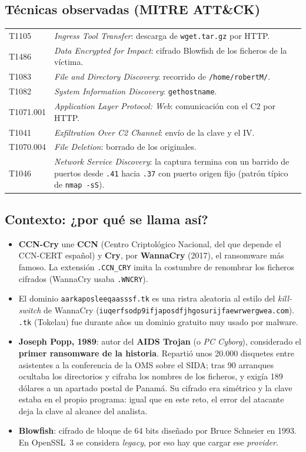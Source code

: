 \documentclass[11pt,a4paper]{article}
\begin{document}
\subsection{Técnicas observadas (MITRE ATT\&CK)}
\begin{tabularx}{\linewidth}{@{}lX@{}}
\toprule
T1105 & \emph{Ingress Tool Transfer}: descarga de \texttt{wget.tar.gz} por HTTP. \\
T1486 & \emph{Data Encrypted for Impact}: cifrado Blowfish de los ficheros de la víctima. \\
T1083 & \emph{File and Directory Discovery}: recorrido de \texttt{/home/robertM/}. \\
T1082 & \emph{System Information Discovery}: \texttt{gethostname}. \\
T1071.001 & \emph{Application Layer Protocol: Web}: comunicación con el C2 por HTTP. \\
T1041 & \emph{Exfiltration Over C2 Channel}: envío de la clave y el IV. \\
T1070.004 & \emph{File Deletion}: borrado de los originales. \\
T1046 & \emph{Network Service Discovery}: la captura termina con un barrido de puertos desde \texttt{.41} hacia
        \texttt{.37} con puerto origen fijo (patrón típico de \texttt{nmap -sS}). \\
\bottomrule
\end{tabularx}

\subsection{Contexto: ¿por qué se llama así?}
\begin{itemize}
  \item \textbf{CCN-Cry} une \textbf{CCN} (Centro Criptológico Nacional, del que depende el CCN-CERT español) y
        \textbf{Cry}, por \textbf{WannaCry} (2017), el ransomware más famoso. La extensión \texttt{.CCN\_CRY} imita
        la costumbre de renombrar los ficheros cifrados (WannaCry usaba \texttt{.WNCRY}).
  \item El dominio \texttt{aarkaposleeqaasssf.tk} es una ristra aleatoria al estilo del \emph{kill-switch} de WannaCry
        (\texttt{iuqerfsodp9ifjaposdfjhgosurijfaewrwergwea.com}). \texttt{.tk} (Tokelau) fue durante años un dominio
        gratuito muy usado por malware.
  \item \textbf{Joseph Popp, 1989}: autor del \textbf{AIDS Trojan} (o \emph{PC Cyborg}), considerado el
        \textbf{primer ransomware de la historia}. Repartió unos 20.000 disquetes entre asistentes a la conferencia
        de la OMS sobre el SIDA; tras 90 arranques ocultaba los directorios y cifraba los nombres de los ficheros, y
        exigía 189 dólares a un apartado postal de Panamá. Su cifrado era simétrico y la clave estaba en el propio
        programa: igual que en este reto, el error del atacante deja la clave al alcance del analista.
  \item \textbf{Blowfish}: cifrado de bloque de 64 bits diseñado por Bruce Schneier en 1993. En OpenSSL~3 se considera
        \emph{legacy}, por eso hay que cargar ese \emph{provider}.
\end{itemize}
\end{document}
